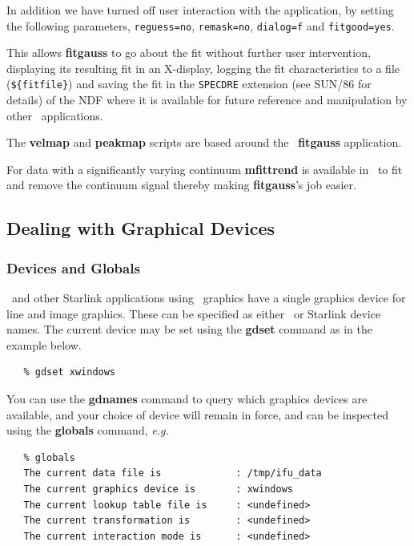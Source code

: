 \documentclass[twoside,11pt]{article}
\newcommand{\xref}[3]{#1}
\newcommand{\xlabel}[1]{}
\newcommand{\latex}[1]{#1}
\begin{document}
{In addition we have turned off user interaction with the application,
by setting the following parameters, \verb+reguess=no+,
\verb+remask=no+, \verb+dialog=f+ and \verb+fitgood=yes+.

This allows {\bf fitgauss} to go about the fit without further user
intervention, displaying its resulting fit in an X-display, logging
the fit characteristics to a file (\verb+${fitfile}+) and saving the
fit in the \xref{{\tt SPECDRE} extension}{sun86}{extension}
\latex{(see SUN/86 for details)} of the NDF where it is available
for future reference and manipulation by other \SPECDRE\ applications.

The \xref{{\bf velmap}}{sun237}{velmap} and \xref{{\bf
peakmap}}{sun237}{peakmap} scripts are based around the \SPECDRE\
{\bf fitgauss} application.

For data with a significantly varying continuum \xref{{\bf
mfittrend}}{sun95}{MFITTREND} is available in \KAPPA\ to fit and
remove the continuum signal thereby making {\bf fitgauss}'s job easier.

\subsection{\label{sc16_graphics}Dealing with Graphical Devices\xlabel{sc16_graphics}}

\subsubsection{Devices and Globals}

\KAPPAref\ and other Starlink applications using \PGPLOTref\ graphics
have a single \xref{graphics device}{sun95}{se_graphdev} for line and
image graphics.  These can be specified as either \xref{\PGPLOT\ or
Starlink device names}{sun95}{se_selgradev}.  The current device may
be set using the \xref{{\bf gdset}}{sun95}{GDSET} command as in the example
below.

\small\begin{verbatim}
   % gdset xwindows
\end{verbatim}\normalsize

You can use the \xref{{\bf gdnames}}{sun95}{GDNAMES} command to query which
graphics devices are available, and your choice of device will remain
in force, and can be inspected using the
\xref{{\bf globals}}{sun95}{GLOBALS} command, \emph{e.g.}\

\small\begin{verbatim}
   % globals
   The current data file is             : /tmp/ifu_data
   The current graphics device is       : xwindows
   The current lookup table file is     : <undefined>
   The current transformation is        : <undefined>
   The current interaction mode is      : <undefined>
\end{verbatim}\normalsize

}
\end{document}
